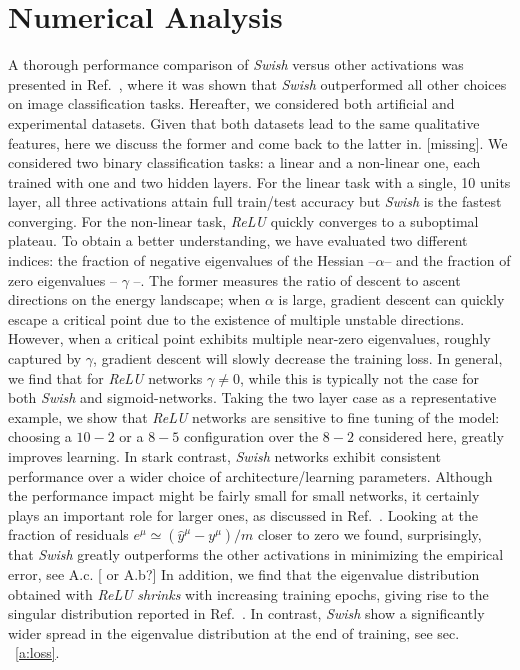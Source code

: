 \documentclass{article}
\begin{document}
\section{Numerical Analysis}
%
A thorough performance comparison of {\it Swish} versus other activations was presented in Ref.~\cite{prajit}, where it was shown that {\it Swish} outperformed all other choices on image classification tasks. Hereafter,  we considered both artificial and experimental datasets. Given that both datasets lead to the same qualitative features, here we discuss the former and come back to the latter in. [{\color{red}missing}]. We considered two binary classification tasks: a linear and a non-linear one, each trained with one and two hidden layers. For the linear task with a single, 10 units layer, all three activations attain full train/test accuracy but {\it Swish} is the fastest converging.  For the non-linear task, {\it ReLU} quickly converges to a suboptimal plateau. To obtain a better understanding, we have evaluated two different indices: the fraction of negative eigenvalues of the Hessian --$\alpha$-- and the fraction of zero eigenvalues -- $\gamma$ --. The former measures the ratio of descent to ascent directions on the energy landscape; when $\alpha$ is large, gradient descent can quickly escape a critical point due to the existence of multiple unstable directions. However, when a critical point exhibits multiple near-zero eigenvalues, roughly captured by $\gamma$, gradient descent will slowly decrease the training loss.
In general, we find that for {\it ReLU} networks $\gamma \neq 0$, while this is typically not the case for both {\it Swish} and sigmoid-networks. Taking the two layer case as a representative example, we show that {\it ReLU} networks are sensitive to fine tuning of the model: choosing a $10-2$ or a $8-5$ configuration over the $8-2$ considered here, greatly improves learning. In stark contrast, {\it Swish} networks exhibit consistent performance over a wider choice of architecture/learning parameters. Although the performance impact might be fairly small for small networks, it certainly plays an important role for larger ones, as discussed in Ref.~\cite{prajit}. Looking at the fraction of residuals $e^{\mu} \simeq (\hat{y}^{\mu} - y^{\mu})/m$ closer to zero we found, surprisingly, that {\it Swish} greatly outperforms the other activations in minimizing the empirical error, see A.c. [{\color{red} or A.b?}]
%
In addition, we find that the eigenvalue distribution obtained with {\it ReLU}  {\it shrinks} with increasing training epochs, giving rise to the singular distribution reported in Ref.~\cite{penn1, levent}. In contrast, {\it Swish} show a significantly wider spread in the eigenvalue distribution at the end of training, see sec. ~\eqref{a:loss}.
\end{document}
